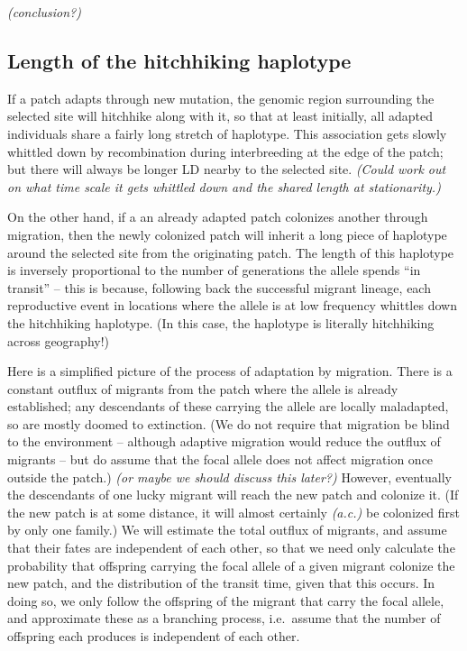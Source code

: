 \documentclass{article}
\newcommand{\plr}[1]{{\it\color{blue}(#1)}}
\begin{document}
\plr{conclusion?}

\subsection{Length of the hitchhiking haplotype}
\label{ss:haplotype_length}

If a patch adapts through new mutation, the genomic region surrounding the selected site will hitchhike \citep{hitchhiking} along with it,
so that at least initially, all adapted individuals share a fairly long stretch of haplotype.
This association gets slowly whittled down by recombination during interbreeding at the edge of the patch;
but there will always be longer LD nearby to the selected site.
\plr{Could work out on what time scale it gets whittled down and the shared length at stationarity.}

On the other hand, if a an already adapted patch colonizes another through migration,
then the newly colonized patch will inherit a long piece of haplotype around the selected site from the originating patch.
The length of this haplotype is inversely proportional to the number of generations the allele spends ``in transit'' --
this is because, following back the successful migrant lineage, 
each reproductive event in locations where the allele is at low frequency
whittles down the hitchhiking haplotype.
(In this case, the haplotype is literally hitchhiking across geography!)

Here is a simplified picture of the process of adaptation by migration.
There is a constant outflux of migrants from the patch where the allele is already established; 
any descendants of these carrying the allele are locally maladapted, so are mostly doomed to extinction.
(We do not require that migration be blind to the environment --
although adaptive migration would reduce the outflux of migrants --
but do assume that the focal allele does not affect migration once outside the patch.)
\plr{or maybe we should discuss this later?}
However, eventually the descendants of one lucky migrant will reach the new patch and colonize it.
(If the new patch is at some distance, it will almost certainly \plr{a.c.} be colonized first by only one family.)
We will estimate the total outflux of migrants, and assume that their fates are independent of each other,
so that we need only calculate the probability that offspring carrying the focal allele of a given migrant colonize the new patch,
and the distribution of the transit time, given that this occurs.
In doing so, we only follow the offspring of the migrant that carry the focal allele,
and approximate these as a branching process, 
i.e.\ assume that the number of offspring each produces is independent of each other.
\end{document}
